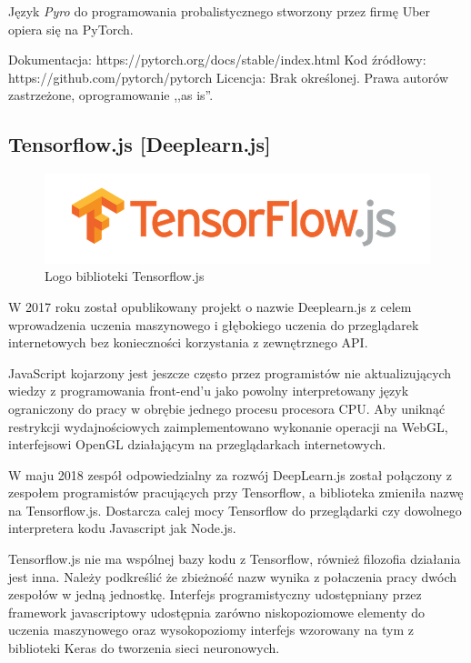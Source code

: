 \documentclass[12pt,a4paper,twoside,titlepage,openright]{book}
\begin{document}
Język \textit{Pyro} do programowania probalistycznego stworzony przez firmę Uber opiera się na PyTorch.

\noindent
\newline
Dokumentacja: https://pytorch.org/docs/stable/index.html
\newline
Kod źródłowy: https://github.com/pytorch/pytorch
\newline
Licencja: Brak określonej. Prawa autorów zastrzeżone, oprogramowanie ,,as is''.


\subsection{Tensorflow.js [Deeplearn.js]}
\begin{figure}[ht]
	\centering
			\includegraphics[resolution=100, scale=0.6]{TensorflowJS.png}
		\caption{Logo biblioteki Tensorflow.js}
\end{figure}

W 2017 roku został opublikowany projekt o nazwie Deeplearn.js z celem wprowadzenia uczenia maszynowego i głębokiego uczenia do przeglądarek internetowych bez konieczności korzystania z zewnętrznego API.

JavaScript kojarzony jest jeszcze często przez programistów nie aktualizujących wiedzy z programowania front-end'u jako powolny interpretowany język ograniczony do pracy w obrębie jednego procesu procesora CPU. \cite{siteSlowJavaScript} Aby uniknąć restrykcji wydajnościowych zaimplementowano wykonanie operacji na WebGL, interfejsowi OpenGL działającym na przeglądarkach internetowych.

W maju 2018 zespół odpowiedzialny za rozwój DeepLearn.js został połączony z zespołem programistów pracujących przy Tensorflow, a biblioteka zmieniła nazwę na Tensorflow.js. Dostarcza calej mocy Tensorflow do przeglądarki czy dowolnego interpretera kodu Javascript jak Node.js.

Tensorflow.js nie ma wspólnej bazy kodu z Tensorflow, również filozofia działania jest inna. Należy podkreślić że zbieżność nazw wynika z połaczenia pracy dwóch zespołów w jedną jednostkę. Interfejs programistyczny udostępniany przez framework javascriptowy udostępnia zarówno niskopoziomowe elementy do uczenia maszynowego oraz wysokopoziomy interfejs wzorowany na tym z biblioteki Keras do tworzenia sieci neuronowych.
\end{document}
